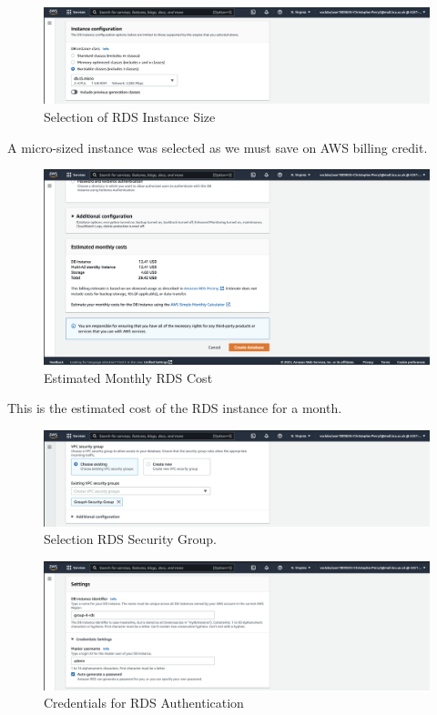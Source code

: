 \begin{figure}
    \centering
    \includegraphics[width=\textwidth]{resources/rds/rds-instance-config.png}
    \caption{Selection of RDS Instance Size}
    \label{fig:rds-instance-conf}
\end{figure}

A micro-sized instance was selected as we must save on AWS billing credit.

\begin{figure}
    \centering
    \includegraphics[width=\textwidth]{resources/rds/rds-monthly-costs.png}
    \caption{Estimated Monthly RDS Cost}
    \label{fig:rds-costs}
\end{figure}

This is the estimated cost of the RDS instance for a month.

\begin{figure}
    \centering
    \includegraphics[width=\textwidth]{resources/rds/rds-security-group.png}
    \caption{Selection RDS Security Group.}
    \label{fig:rds-security}
\end{figure}

\begin{figure}
    \centering
    \includegraphics[width=\textwidth]{resources/rds/rds-settings.png}
    \caption{Credentials for RDS Authentication}
    \label{fig:rds-settings}
\end{figure}

